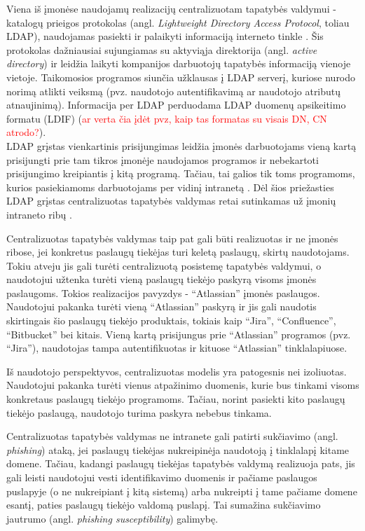 Viena iš įmonėse naudojamų realizacijų centralizuotam tapatybės valdymui - 
katalogų prieigos protokolas (angl. \textit{Lightweight Directory Access Protocol}, toliau LDAP), naudojamas pasiekti ir palaikyti informaciją interneto tinkle \cite{Strictest2011}.
Šis protokolas dažniausiai sujungiamas su aktyviąja direktorija (angl. \textit{active directory}) ir leidžia laikyti kompanijos darbuotojų
tapatybės informaciją vienoje vietoje. Taikomosios programos siunčia užklausas į LDAP serverį, kuriose nurodo norimą atlikti veiksmą (pvz. naudotojo
autentifikavimą ar naudotojo atributų atnaujinimą). Informacija per LDAP perduodama LDAP duomenų apsikeitimo formatu (LDIF) (\textcolor{red}{ar verta čia įdėt pvz, kaip tas
formatas su visais DN, CN atrodo?}).\\
LDAP grįstas vienkartinis prisijungimas leidžia įmonės darbuotojams vieną kartą prisijungti prie tam tikros įmonėje naudojamos programos ir
nebekartoti prisijungimo kreipiantis į kitą programą. Tačiau, tai galios tik toms programoms, kurios pasiekiamoms darbuotojams per vidinį intranetą
\cite{Strictest2011}. Dėl šios priežasties LDAP grįstas centralizuotas tapatybės valdymas retai sutinkamas už įmonių intraneto ribų \cite{Strictest2011}.

Centralizuotas tapatybės valdymas taip pat gali būti realizuotas ir ne įmonės ribose, jei konkretus paslaugų tiekėjas
turi keletą paslaugų, skirtų naudotojams. Tokiu atveju jis gali turėti centralizuotą posistemę tapatybės valdymui, o naudotojui užtenka
turėti vieną paslaugų tiekėjo paskyrą visoms įmonės paslaugoms. Tokios realizacijos pavyzdys - \enquote{Atlassian} įmonės paslaugos. Naudotojui pakanka turėti vieną \enquote{Atlassian} paskyrą ir jis gali naudotis
skirtingais šio paslaugų tiekėjo produktais, tokiais kaip \enquote{Jira}, \enquote{Confluence}, \enquote{Bitbucket} bei kitais. Vieną kartą prisijungus prie \enquote{Atlassian} programos (pvz. \enquote{Jira}),
naudotojas tampa autentifikuotas ir kituose \enquote{Atlassian} tinklalapiuose. 

 
Iš naudotojo perspektyvos, centralizuotas modelis yra patogesnis nei izoliuotas. Naudotojui pakanka turėti vienus atpažinimo duomenis,
kurie bus tinkami visoms konkretaus paslaugų tiekėjo programoms. Tačiau, norint pasiekti kito paslaugų tiekėjo paslaugą,
naudotojo turima paskyra nebebus tinkama.

Centralizuotas tapatybės valdymas ne intranete gali patirti sukčiavimo (angl. \textit{phishing}) ataką, jei paslaugų tiekėjas nukreipinėja naudotoją į tinklalapį kitame domene. Tačiau,
kadangi paslaugų tiekėjas tapatybės valdymą realizuoja pats, jis gali leisti naudotojui vesti identifikavimo duomenis ir pačiame paslaugos puslapyje (o ne nukreipiant
į kitą sistemą) arba nukreipti į tame pačiame domene esantį, paties paslaugų tiekėjo valdomą puslapį. Tai sumažina sukčiavimo jautrumo (angl. \textit{phishing susceptibility}) galimybę.

